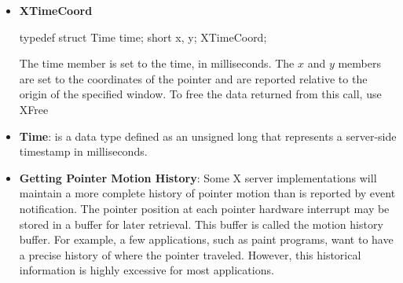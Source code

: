 \documentclass{report}
\begin{document}
\begin{itemize}
\begin{itemize}
                \item If propagate is False, the event is sent to every client selecting on destination any of the event types in the event\_mask argument.
                \item If propagate is True and no clients have selected on destination any of the event types in event-mask, the destination is replaced with the closest ancestor of destination for which some client has selected a type in event-mask and for which no intervening window has that type in its do-not-propagate-mask. If no such window exists or if the window is an ancestor of the focus window and InputFocus was originally specified as the destination, the event is not sent to any clients. Otherwise, the event is reported to every client selecting on the final destination any of the types specified in event\_mask.
            \end{itemize}
            The event in the XEvent structure must be one of the core events or one of the events defined by an extension (or a BadValue error results) so that the X server can correctly byte-swap the contents as necessary. The contents of the event are otherwise unaltered and unchecked by the X server except to force send\_event to True in the forwarded event and to set the serial number in the event correctly; therefore these fields and the display field are ignored by XSendEvent
            \bigbreak \noindent 
            XSendEvent returns zero if the conversion to wire protocol format failed and returns nonzero otherwise.
            \bigbreak \noindent 
            XSendEvent can generate BadValue and BadWindow errors.
        \item \textbf{XTimeCoord}
            \bigbreak \noindent 
            \begin{cppcode}
                typedef struct {
                    Time time;
                    short x, y;
                } XTimeCoord;
            \end{cppcode}
            \bigbreak \noindent 
            The time member is set to the time, in milliseconds. The $x$ and $y$ members are set to the coordinates of the pointer and are reported relative to the origin of the specified window. To free the data returned from this call, use XFree
        \item \textbf{Time}: is a data type defined as an unsigned long that represents a server-side timestamp in milliseconds. 
        \item \textbf{Getting Pointer Motion History}: Some X server implementations will maintain a more complete history of pointer motion than is reported by event notification. The pointer position at each pointer hardware interrupt may be stored in a buffer for later retrieval. This buffer is called the motion history buffer. For example, a few applications, such as paint programs, want to have a precise history of where the pointer traveled. However, this historical information is highly excessive for most applications.

\end{itemize}
\end{document}
